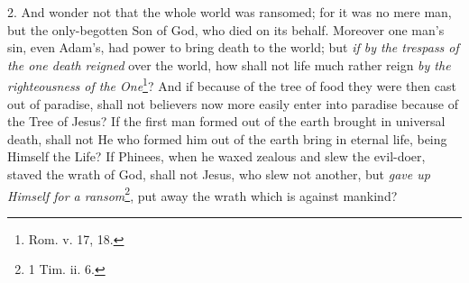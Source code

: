 2. And wonder not that the whole world was ransomed; for it was no mere man, but the only-begotten Son of God, who died on its behalf. Moreover one man’s sin, even Adam’s, had power to bring death to the world; but \emph{if by the trespass of the one death reigned} over the world, how shall not life much rather reign \emph{by the righteousness of the One}\footnote{Rom. v. 17, 18.}? And if because of the tree of food they were then cast out of paradise, shall not believers now more easily enter into paradise because of the Tree of Jesus? If the first man formed out of the earth brought in universal death, shall not He who formed him out of the earth bring in eternal life, being Himself the Life? If Phinees, when he waxed zealous and slew the evil-doer, staved the wrath of God, shall not Jesus, who slew not another, but \emph{gave up Himself for a ransom}\footnote{1 Tim. ii. 6.}, put away the wrath which is against mankind?

